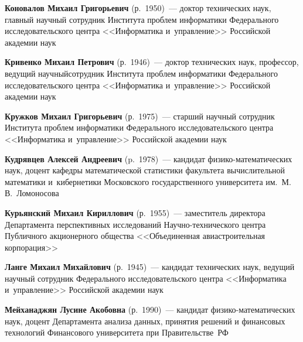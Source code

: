\begin{multicols}{2}
\vspace*{3pt}


\noindent
\textbf{Коновалов Михаил Григорьевич} (р.\ 1950)~--- 
доктор технических наук, главный научный сотрудник Института проб\-лем 
информатики Федерального исследовательского центра <<Информатика и~управ\-ле\-ние>>
Российской академии наук

\vspace*{3pt}


\noindent
\textbf{Кривенко Михаил Петрович} (р.\ 1946)~--- 
доктор технических наук, профессор, ведущий научный\linebreak сотрудник 
Института проб\-лем информатики Федерального исследовательского центра 
<<Информатика и~управ\-ле\-ние>> Российской академии наук

\vspace*{3pt}


\noindent
\textbf{Кружков Михаил Григорьевич} (р.\ 1975)~--- 
старший научный сотрудник Института проб\-лем информатики Федерального 
исследовательского центра <<Информатика и~управ\-ле\-ние>> Российской академии наук

\vspace*{3pt}


\noindent
\textbf{Кудрявцев Алексей Андреевич} (p.\ 1978)~--- 
кандидат фи\-зи\-ко-ма\-те\-ма\-ти\-че\-ских наук, 
доцент кафедры математической статистики
 факультета вычислительной математики и~кибернетики Московского 
 государственного университета им.\ М.\,В.~Ломоносова

\vspace*{3pt}


\noindent
\textbf{Курьянский Михаил Кириллович} (р.\ 1955)~--- 
заместитель директора Департамента перспективных исследований 
На\-уч\-но-тех\-ни\-че\-ско\-го центра Пуб\-лич\-но\-го акционерного общества 
<<Объединенная авиастроительная корпорация>>

\vspace*{3pt}



\noindent
\textbf{Ланге Михаил Михайлович} (р.\ 1945)~--- 
кандидат технических наук, ведущий научный сотрудник 
Федерального исследовательского центра <<Информатика и~управ\-ле\-ние>> 
Российской академии наук

\vspace*{3pt}


\noindent
\textbf{Мейханаджян Лусине Акобовна} (р.\ 1990)~---
кандидат фи\-зи\-ко-ма\-те\-ма\-ти\-че\-ских наук,
доцент Департамента анализа данных, принятия решений и финансовых технологий
Финансового университета при Правительстве~РФ


\end{multicols}
